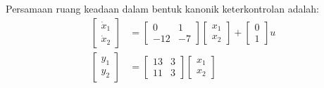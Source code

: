 \documentclass[11pt,a4paper]{article}
\begin{document}
Persamaan ruang keadaan dalam bentuk kanonik keterkontrolan adalah:
\begin{align*}
    \begin{bmatrix} \dot{x}_1 \\ \dot{x}_2 \end{bmatrix} &= \begin{bmatrix} 0 & 1 \\ -12 & -7 \end{bmatrix} \begin{bmatrix} x_1 \\ x_2 \end{bmatrix} + \begin{bmatrix} 0 \\ 1 \end{bmatrix} u \\
    \begin{bmatrix} y_1 \\ y_2 \end{bmatrix} &= \begin{bmatrix} 13 & 3 \\ 11 & 3 \end{bmatrix} \begin{bmatrix} x_1 \\ x_2 \end{bmatrix}
\end{align*}
\end{document}
